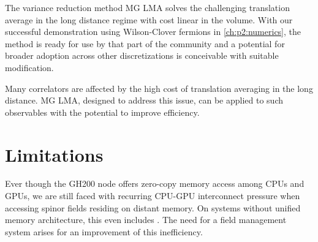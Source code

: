 The variance reduction method MG LMA solves the challenging translation average in the long distance regime with cost linear in the volume.
With our successful demonstration using Wilson-Clover fermions in \cref{ch:p2:numerics}, the method is ready for use by that part of the community and a potential for broader adoption across other discretizations is conceivable with suitable modification.

Many correlators are affected by the high cost of translation averaging in the long distance.
MG LMA, designed to address this issue, can be applied to such observables with the potential to improve efficiency.


\section{Limitations}


Ever though the GH200 node offers zero-copy memory access among CPUs and GPUs, we are still faced with recurring CPU-GPU interconnect pressure when accessing spinor fields residing on distant memory.
On systems without unified memory architecture, this even includes .
The need for a field management system arises for an improvement of this inefficiency.


